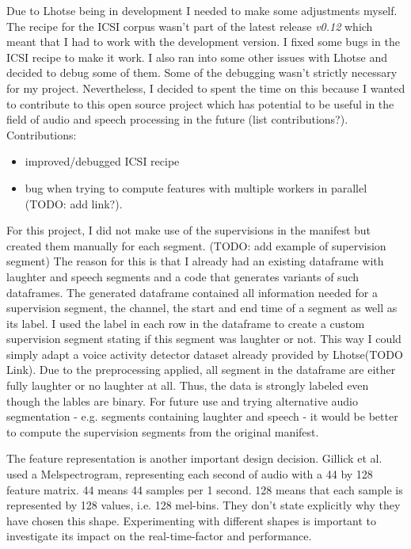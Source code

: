 \documentclass[bsc,frontabs,parskip,deptreport]{infthesis}
\begin{document}
Due to Lhotse being in development I needed to make some adjustments myself. The recipe for the ICSI corpus wasn't part of the latest release \textit{v0.12} which meant that I had to work with the development version. I fixed some bugs in the ICSI recipe to make it work. I also ran into some other issues with Lhotse and decided to debug some of them. Some of the debugging wasn't strictly necessary for my project. Nevertheless, I decided to spent the time on this because I wanted to contribute to this open source project which has potential to be useful in the field of audio and speech processing in the future (list contributions?).
Contributions: 
\begin{itemize}
    \item improved/debugged ICSI recipe 
    \item bug when trying to compute features with multiple workers in parallel (TODO: add link?).
\end{itemize}

For this project, I did not make use of the supervisions in the manifest but created them manually for each segment. (TODO: add example of supervision segment)
The reason for this is that I already had an existing dataframe with laughter and speech segments and a code that generates variants of such dataframes.
The generated dataframe contained all information needed for a supervision segment, the channel, the start and end time of a segment as well as its label. 
I used the label in each row in the dataframe to create a custom supervision segment stating if this segment was laughter or not. 
This way I could simply adapt a voice activity detector dataset already provided by Lhotse(TODO Link). Due to the preprocessing applied, all segment in the dataframe are either fully laughter or no laughter at all.
Thus, the data is strongly labeled even though the lables are binary.
For future use and trying alternative audio segmentation - e.g. segments containing laughter and speech - it would be better to compute the supervision segments from the original manifest.  


The feature representation is another important design decision. Gillick et al. \citep{gillick2021robust} used a Melspectrogram, representing each second of audio with a 44 by 128 feature matrix. 44 means 44 samples per 1 second. 128 means that each sample is represented by 128 values, i.e. 128 mel-bins. They don't state explicitly why they have chosen this shape. 
Experimenting with different shapes is important to investigate its impact on the real-time-factor and performance.  
\end{document}
